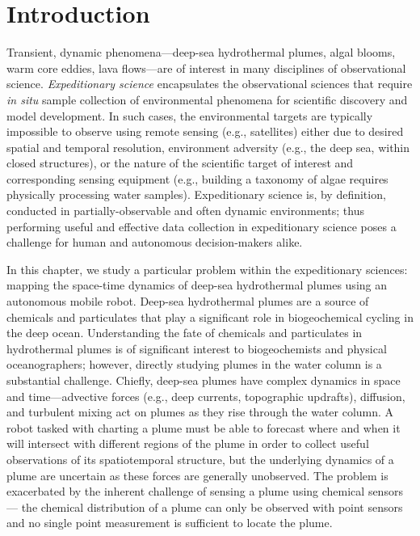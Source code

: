 \section{Introduction}
Transient, dynamic phenomena---deep-sea hydrothermal plumes, algal blooms, warm core eddies, lava flows---are of interest in many disciplines of observational science. \emph{Expeditionary science} encapsulates the observational sciences that require \emph{in situ} sample collection of environmental phenomena for scientific discovery and model development. In such cases, the environmental targets are typically impossible to observe using remote sensing (e.g., satellites) either due to desired spatial and temporal resolution, environment adversity (e.g., the deep sea, within closed structures), or the nature of the scientific target of interest and corresponding sensing equipment (e.g., building a taxonomy of algae requires physically processing water samples). Expeditionary science is, by definition, conducted in partially-observable and often dynamic environments; thus performing useful and effective data collection in expeditionary science poses a challenge for human and autonomous decision-makers alike.

In this chapter, we study a particular problem within the expeditionary sciences: mapping the space-time dynamics of deep-sea hydrothermal plumes using an autonomous mobile robot. Deep-sea hydrothermal plumes are a source of chemicals and particulates that play a significant role in biogeochemical cycling in the deep ocean\autocite{le2019hydrothermal,resing2015basin,dick2013microbiology, vic2018dispersion, scholz2019shelf}. Understanding the fate of chemicals and particulates in hydrothermal plumes is of significant interest to biogeochemists and physical oceanographers; however, directly studying plumes in the water column is a substantial challenge. Chiefly, deep-sea plumes have complex dynamics in space and time---advective forces (e.g., deep currents, topographic updrafts), diffusion, and turbulent mixing act on plumes as they rise through the water column. A robot tasked with charting a plume must be able to forecast where and when it will intersect with different regions of the plume in order to collect useful observations of its spatiotemporal structure, but the underlying dynamics of a plume are uncertain as these forces are generally unobserved. The problem is exacerbated by the inherent challenge of sensing a plume using chemical sensors --- the chemical distribution of a plume can only be observed with point sensors and no single point measurement is sufficient to locate the plume.

